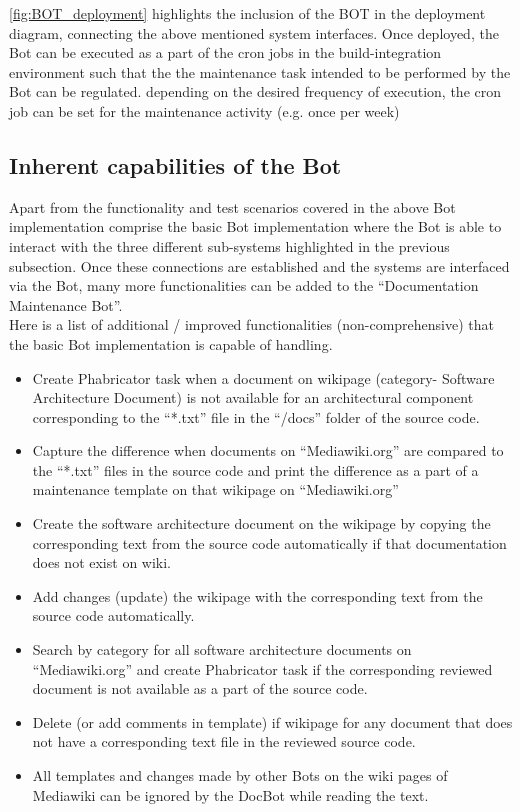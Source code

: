 \autoref{fig:BOT_deployment} highlights the inclusion of the BOT in the deployment diagram, connecting the above mentioned system interfaces.
\newline Once deployed, the Bot can be executed as a part of the cron jobs in the build-integration environment such that the the maintenance task intended to be performed by the Bot can be regulated. depending on the desired frequency of execution, the cron job can be set for the maintenance activity (e.g. once per week)


\subsection{Inherent capabilities of the Bot }\label{capabilities}
\indent Apart from the functionality and test scenarios covered in the above Bot implementation comprise the basic Bot implementation where the Bot is able to interact with the three different sub-systems highlighted in the previous subsection. Once these connections are established and the systems are interfaced via the Bot, many more functionalities can be added to the \enquote{Documentation Maintenance Bot}.
\\\indent Here is a list of additional / improved functionalities (non-comprehensive) that the basic Bot implementation is capable of handling.
\begin{itemize}
\item Create Phabricator task when a document on wikipage (category- Software Architecture Document) is not available for an architectural component corresponding to the \enquote{*.txt} file in the \enquote{/docs} folder of the source code.
\item Capture the difference when documents on \enquote{Mediawiki.org} are compared to the \enquote{*.txt} files in the source code and print the difference as a part of a maintenance template on that wikipage on \enquote{Mediawiki.org}
\item Create the software architecture document on the wikipage by copying the corresponding text from the source code automatically if that documentation does not exist on wiki.
\item Add changes (update) the wikipage with the corresponding text from the source code automatically.
\item Search by category for all software architecture documents on \enquote{Mediawiki.org} and create Phabricator task if the corresponding reviewed document is not available as a part of the source code.
\item Delete (or add comments in template) if wikipage for any document that does not have a corresponding text file in the reviewed source code.
\item All templates and changes made by other Bots on the wiki pages of Mediawiki can be ignored by the DocBot while reading the text.
\end{itemize}

